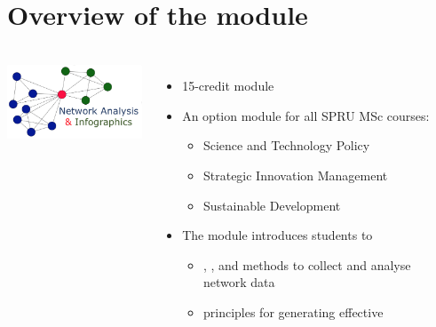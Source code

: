 \documentclass[8pt]{beamer}
\begin{document}








\section{Overview of the module}


\bgroup
{}
\begin{frame}[plain]{}
\begin{center}
\color{white}{\Huge \insertsection}
\end{center}
\end{frame}
\egroup


\begin{frame}
\frametitle{\insertsection}

\begin{columns}[c]

\centering
\includegraphics[width=4.5cm]{logo}

	\begin{itemize}
	\item 15-credit module
	
	\medskip
	
	\item An option module for all SPRU MSc courses:
		\begin{itemize}
		\item Science and Technology Policy
		\item Strategic Innovation Management
		\item Sustainable Development
		\end{itemize}
		
	\medskip
	
	\item The module introduces students to
		\begin{itemize}
		\item {\color{blue}{qualitative}}, {\color{blue}{quantitative}}, and {\color{blue}{mixed}} methods to collect and analyse network data
		\item principles for generating effective {\color{blue}{infographics}}
		\end{itemize}

	\end{itemize}
	
\end{columns}

\end{frame}
\end{document}
